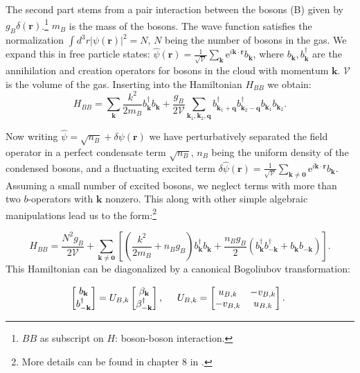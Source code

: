 The second part stems from a pair interaction between the bosons (B) given by $g_B\delta(\mathbf{r})$.\footnote{$BB$ as subscript on $H$: boson-boson interaction.} $m_B$ is the mass of the bosons. The wave function satisfies the normalization $\int d^3 r |\psi(\mathbf{r})|^2 = N$, $N$ being the number of bosons in the gas. We expand this in free particle states: $\hat{\psi}(\mathbf{r}) = \frac{1}{\sqrt{\mathcal{V}}}\sum_\mathbf{k} \text{e}^{i\mathbf{k}\cdot\mathbf{r}}b_\mathbf{k}$, where $b_\mathbf{k}, b^\dagger_\mathbf{k}$ are the annihilation and creation operators for bosons in the cloud with momentum $\mathbf{k}$. $\mathcal{V}$ is the volume of the gas. Inserting into the Hamiltonian $H_{BB}$ we obtain: 
\begin{equation}
H_{BB} = \sum_\mathbf{k} \frac{k^2}{2m_B}b_\mathbf{k}^\dagger b_\mathbf{k} + \frac{g_B}{2\mathcal{V}}\sum_{\mathbf{k}_1,\mathbf{k}_2,\mathbf{q}} b^\dagger_{\mathbf{k}_1+\mathbf{q}}b^\dagger_{\mathbf{k}_2-\mathbf{q}}b_{\mathbf{k}_1}b_{\mathbf{k}_2}.  
\end{equation}

Now writing $\hat{\psi} = \sqrt{n_B} + \delta \psi(\mathbf{r})$ we have perturbatively separated the field operator in a perfect condensate term $\sqrt{n_B}$, $n_B$ being the uniform density of the condensed bosons, and a fluctuating excited term $\delta \hat{\psi}(\mathbf{r}) =  \frac{1}{\sqrt{\mathcal{V}}}\sum_{\mathbf{k}\neq \mathbf{0}} \text{e}^{i\mathbf{k}\cdot\mathbf{r}}b_\mathbf{k}$. Assuming a small number of excited bosons, we neglect terms with more than two $b$-operators with $\mathbf{k}$ nonzero. This along with other simple algebraic manipulations lead us to the form:\footnote{More details can be found in chapter 8 in \cite{Pethick}.} 

\begin{equation}
H_{BB} = \frac{N^2g_B}{2\mathcal{V}} + \sum_{\mathbf{k}\neq \mathbf{0}}\left[\left(\frac{k^2}{2m_B}+n_Bg_B\right)b_\mathbf{k}^\dagger b_\mathbf{k} + \frac{n_Bg_B}{2}\left( b_\mathbf{k}^\dagger b_{-\mathbf{k}}^\dagger + b_{\mathbf{k}} b_{-\mathbf{k}} \right) \right].
\label{eq.bosonHamiltonian}
\end{equation}
This Hamiltonian can be diagonalized by a canonical Bogoliubov transformation:

\begin{equation}
\begin{bmatrix} b_\mathbf{k} \\ b^\dagger_{-\mathbf{k}} \end{bmatrix} = U_{B,k} \begin{bmatrix} \beta_\mathbf{k} \\ \beta^\dagger_{-\mathbf{k}}\end{bmatrix}, \hspace{0.5cm} U_{B,k} = \begin{bmatrix} u_{B,k} & -v_{B,k} \\ -v_{B,k} & u_{B,k} \end{bmatrix}. 
\end{equation}

